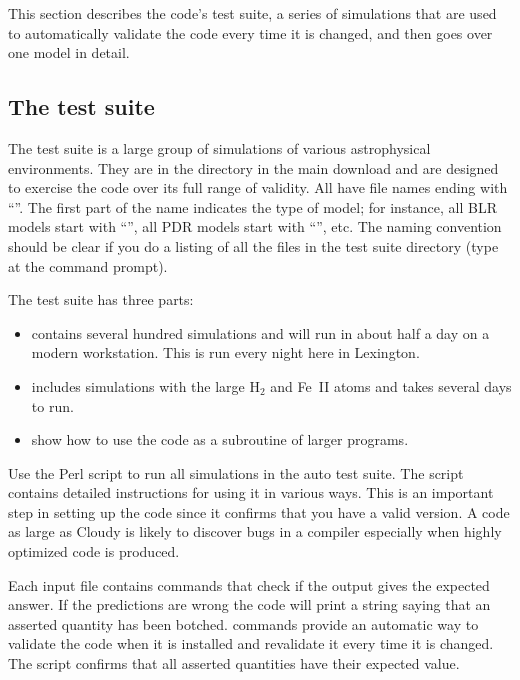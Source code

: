 \documentclass[12pt,twoside]{article}
\begin{document}
This section describes the code's test suite, a series of simulations
that are used to automatically validate the code every time it is changed,
and then goes over one model in detail.

\subsection{The test suite}

The test suite is a large group of simulations of various astrophysical
environments.  They are in the 
directory in the main download and
are designed to exercise the code over its full range of validity.  All
have file names ending with ``''.
The first part of the name indicates
the type of model; for instance, all BLR
models start with ``'', all
PDR models start with ``'', etc.
The naming convention should be clear
if you do a listing of all the files in the test suite directory (type
 at the command prompt).

The test suite has three parts:

\begin{itemize}
\item {} contains several hundred
simulations and will run in about half a day on a modern workstation.
This is run every night here in Lexington.

\item {} includes simulations with the
large H$_2$ and Fe~II atoms and takes several
days to run.

\item {} show how
to use the code as a subroutine of larger programs.
\end{itemize}

Use the Perl script 
to run all simulations in the auto test suite.
The script contains detailed instructions for using it in various ways.
This is an important step in setting up the code since it confirms
that you have a valid version.
A code as large as Cloudy is likely to
discover bugs in a compiler especially when highly optimized code is
produced.

Each input file contains 
commands that check if the output gives
the expected answer.  If the predictions are wrong the code will print a
string saying that an asserted quantity has
been botched.   commands
provide an automatic way to validate the code when it is installed and
revalidate it every time it is changed.
The script  confirms
that all asserted quantities have their expected value.
\end{document}
